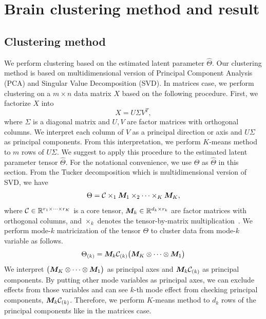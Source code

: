 \documentclass[11pt]{article}
\theoremstyle{plain}
\theoremstyle{definition}
\begin{document}
\section{Brain clustering method and result}
\subsection{Clustering method}
We perform clustering based on the estimated latent parameter $\hat\Theta$. Our clustering method is based on multidimensional version of Principal Component Analysis (PCA) and Singular Value Decomposition (SVD). In matrices case, we perform clustering on a $m\times n$ data matrix $X$ based on the following procedure. First, we factorize $X$ into
\begin{equation*}
X = U\Sigma V^T,
\end{equation*}
where $\Sigma$ is a diagonal matrix and $ U,V$ are factor matrices with orthogonal columns. We interpret each column of $V$ as a principal direction or axis and $U\Sigma$ as principal components. From this interpretation, we perform $K$-means method to $m$ rows of $U\Sigma$. We suggest to apply this procedure to the estimated latent parameter tensor $\hat\Theta$. For the notational convenience, we use $\Theta$ as $\hat\Theta$ in this section. From the Tucker decomposition which is multidimensional version of SVD, we have
\begin{equation*}
\Theta = \mathcal{C}\times_1\bm M_1\times_2\cdots\times_K\bm M_K,
\end{equation*}
where $\mathcal{C}\in\mathbb{R}^{r_1\times \cdots \times r_K}$ is a core tensor, $\bm M_k\in\mathbb{R}^{d_k\times r_k}$ are factor matrices with orthogonal columns, and $\times_k$ denotes the tensor-by-matrix multiplication~\cite{kolda2009tensor}. We perform mode-$k$ matricization of the tensor $\Theta$ to cluster data from mode-$k$ variable as follows.
\begin{equation*}
\Theta_{(k)} = \bm M_k\mathcal{C}_{(k)}\big(\bm M_K\otimes\cdots\otimes\bm M_1\big)
\end{equation*}
We interpret $\big(\bm M_K\otimes\cdots\otimes\bm M_1\big)$ as principal axes and $\bm M_k\mathcal{C}_{(k)}$ as principal components. By putting other mode variables as principal axes, we can exclude effects from those variables and can see $k$-th mode effect from checking principal components, $\bm M_k\mathcal{C}_{(k)}$. Therefore, we perform $K$-means method to $d_k$ rows of the principal components like in the matrices case.
\end{document}
